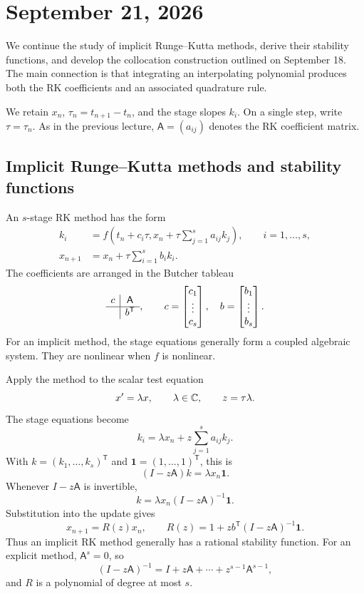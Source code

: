 \section{September 21, 2026}

We continue the study of implicit Runge--Kutta methods, derive their
stability functions, and develop the collocation construction outlined
on September 18. The main connection is that integrating an
interpolating polynomial produces both the RK coefficients and an
associated quadrature rule.

We retain \(x_n\), \(\tau_n=t_{n+1}-t_n\), and the stage slopes
\(k_i\). On a single step, write \(\tau=\tau_n\). As in the previous
lecture, \(\mathsf A=(a_{ij})\) denotes the RK coefficient matrix.

\subsection{Implicit Runge--Kutta methods and stability functions}

An \(s\)-stage RK method has the form
\begin{align}
 k_i&=f\left(t_n+c_i\tau,
       x_n+\tau\sum_{j=1}^s a_{ij}k_j\right),
       \qquad i=1,\ldots,s,
       \label{eq:rk-stages-sep-21}\\
 x_{n+1}&=x_n+\tau\sum_{i=1}^s b_i k_i.
       \label{eq:rk-update-sep-21}
\end{align}
The coefficients are arranged in the Butcher tableau
\[
 \begin{array}{c|c}
  c&\mathsf A\\ \hline
   &b^{\mathsf T}
 \end{array},
 \qquad
 c=\begin{bmatrix}c_1\\ \vdots\\ c_s\end{bmatrix},
 \quad
 b=\begin{bmatrix}b_1\\ \vdots\\ b_s\end{bmatrix}.
\]
For an implicit method, the stage equations generally form a coupled
algebraic system. They are nonlinear when \(f\) is nonlinear.

Apply the method to the scalar test equation
\[
 x'=\lambda x,\qquad \lambda\in\mathbb{C},
 \qquad z=\tau\lambda.
\]
The stage equations become
\[
 k_i=\lambda x_n+z\sum_{j=1}^s a_{ij}k_j.
\]
With \(k=(k_1,\ldots,k_s)^{\mathsf T}\) and
\(\mathbf1=(1,\ldots,1)^{\mathsf T}\), this is
\[
 (I-z\mathsf A)k=\lambda x_n\mathbf1.
\]
Whenever \(I-z\mathsf A\) is invertible,
\[
 k=\lambda x_n(I-z\mathsf A)^{-1}\mathbf1.
\]
Substitution into the update gives
\begin{equation}\label{eq:rk-stability-function-sep-21}
 x_{n+1}=R(z)x_n,
 \qquad
 \boxed{R(z)=1+z b^{\mathsf T}(I-z\mathsf A)^{-1}\mathbf1.}
\end{equation}
Thus an implicit RK method generally has a rational stability
function. For an explicit method, \(\mathsf A^s=0\), so
\[
 (I-z\mathsf A)^{-1}
  =I+z\mathsf A+\cdots+z^{s-1}\mathsf A^{s-1},
\]
and \(R\) is a polynomial of degree at most \(s\).

